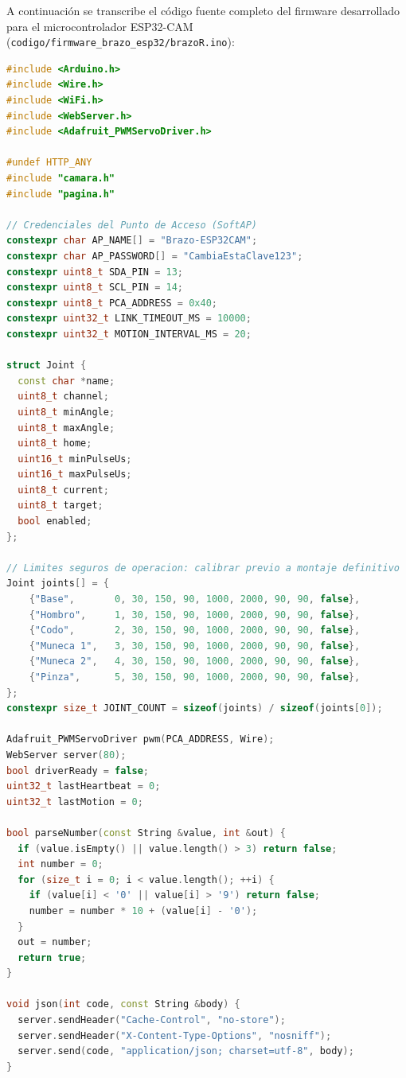 \documentclass[11pt,a4paper]{article}
\begin{document}
A continuación se transcribe el código fuente completo del firmware desarrollado para el microcontrolador ESP32-CAM (\texttt{codigo/firmware\_brazo\_esp32/brazoR.ino}):

\begin{lstlisting}[language=C++, caption={Firmware completo del brazo robótico (brazoR.ino)}]
#include <Arduino.h>
#include <Wire.h>
#include <WiFi.h>
#include <WebServer.h>
#include <Adafruit_PWMServoDriver.h>

#undef HTTP_ANY
#include "camara.h"
#include "pagina.h"

// Credenciales del Punto de Acceso (SoftAP)
constexpr char AP_NAME[] = "Brazo-ESP32CAM";
constexpr char AP_PASSWORD[] = "CambiaEstaClave123";
constexpr uint8_t SDA_PIN = 13;
constexpr uint8_t SCL_PIN = 14;
constexpr uint8_t PCA_ADDRESS = 0x40;
constexpr uint32_t LINK_TIMEOUT_MS = 10000;
constexpr uint32_t MOTION_INTERVAL_MS = 20;

struct Joint {
  const char *name;
  uint8_t channel;
  uint8_t minAngle;
  uint8_t maxAngle;
  uint8_t home;
  uint16_t minPulseUs;
  uint16_t maxPulseUs;
  uint8_t current;
  uint8_t target;
  bool enabled;
};

// Limites seguros de operacion: calibrar previo a montaje definitivo
Joint joints[] = {
    {"Base",       0, 30, 150, 90, 1000, 2000, 90, 90, false},
    {"Hombro",     1, 30, 150, 90, 1000, 2000, 90, 90, false},
    {"Codo",       2, 30, 150, 90, 1000, 2000, 90, 90, false},
    {"Muneca 1",   3, 30, 150, 90, 1000, 2000, 90, 90, false},
    {"Muneca 2",   4, 30, 150, 90, 1000, 2000, 90, 90, false},
    {"Pinza",      5, 30, 150, 90, 1000, 2000, 90, 90, false},
};
constexpr size_t JOINT_COUNT = sizeof(joints) / sizeof(joints[0]);

Adafruit_PWMServoDriver pwm(PCA_ADDRESS, Wire);
WebServer server(80);
bool driverReady = false;
uint32_t lastHeartbeat = 0;
uint32_t lastMotion = 0;

bool parseNumber(const String &value, int &out) {
  if (value.isEmpty() || value.length() > 3) return false;
  int number = 0;
  for (size_t i = 0; i < value.length(); ++i) {
    if (value[i] < '0' || value[i] > '9') return false;
    number = number * 10 + (value[i] - '0');
  }
  out = number;
  return true;
}

void json(int code, const String &body) {
  server.sendHeader("Cache-Control", "no-store");
  server.sendHeader("X-Content-Type-Options", "nosniff");
  server.send(code, "application/json; charset=utf-8", body);
}


\end{lstlisting}
\end{document}
